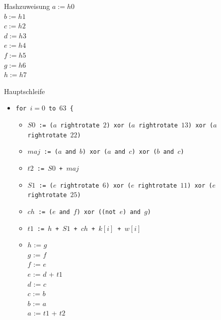 \documentclass[xcolor=x11names,compress]{beamer}
\renewcommand{\(}{\begin{columns}}
\renewcommand{\)}{\end{columns}}
\newcommand{\<}[1]{\begin{column}{#1}}
\renewcommand{\>}{\end{column}}
\begin{document}
\begin{frame}{Hashzuweisung}
\texttt{$a := h0$ \\
    $b := h1$ \\
    $c := h2$ \\
    $d := h3$ \\
    $e := h4$ \\
    $f := h5$ \\
    $g := h6$ \\
    $h := h7$} 
\end{frame}

\begin{frame}{Hauptschleife}
\begin{itemize}[]
\item[]
\texttt{for $i=0$ to $63$ \{} \\
\begin{itemize}[]
\item[]
    \texttt{$S0$ := ($a$ rightrotate $2$) xor ($a$ rightrotate $13$) xor ($a$ rightrotate $22$)} \pause 
\item[]
	\texttt{$maj$ := ($a$ and $b$) xor ($a$ and $c$) xor ($b$ and $c$)}\pause 
\item[]
	\texttt{$t2$ := $S0$ + $maj$} \pause
\item[]
	\texttt{$S1$ := ($e$ rightrotate $6$) xor ($e$ rightrotate $11$) xor ($e$ rightrotate $25$)} \pause
\item[]
	\texttt{$ch$ := ($e$ and $f$) xor ((not $e$) and $g$)} \pause
\item[]
	\texttt{$t1$ := $h$ + $S1$ + $ch$ + $k[i]$ + $w[i]$} \pause
\item[]
        $h$ := $g$ \\
        $g$ := $f$ \\
        $f$ := $e$ \\
        $e$ := $d$ + $t1$ \\
        $d$ := $c$ \\
        $c$ := $b$ \\
        $b$ := $a$ \\
        $a$ := $t1$ + $t2$
\end{itemize}

\end{itemize}

\end{frame}
\end{document}
